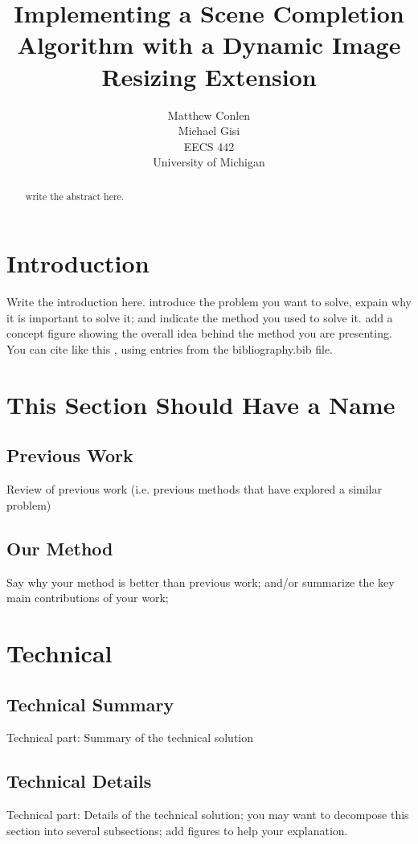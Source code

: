 \documentclass[11pt]{amsart}
\title{Implementing a Scene Completion Algorithm with a Dynamic Image Resizing Extension}
\author{Matthew Conlen \\ Michael Gisi  \\ EECS 442 \\ University of Michigan}
\date{}                                           %
\begin{document}
\maketitle

\begin{abstract}
write the abstract here. 
\end{abstract}

\section{Introduction}

Write the introduction here.  introduce the problem you want to solve, expain why it is important to solve it; and indicate the method you used to solve it. add a concept figure showing the overall idea behind the method you are presenting. You can cite like this \cite{Hays:2007, Karger:1992, Avidan:2007, Torralba:2006, Perez:2003}, using entries from the bibliography.bib file.

\section{This Section Should Have a Name} 
\subsection{Previous Work}
Review of previous work (i.e. previous methods that have explored a similar problem)

\subsection{Our Method}
Say why your method is better than previous work; and/or summarize the key main contributions of your work; 

\section{Technical}

\subsection{Technical Summary}
Technical part: Summary of the technical solution 

\subsection{Technical Details}
Technical part: Details of the technical solution; you may want to decompose this section into several subsections; add figures to help your explanation. 
\end{document}
